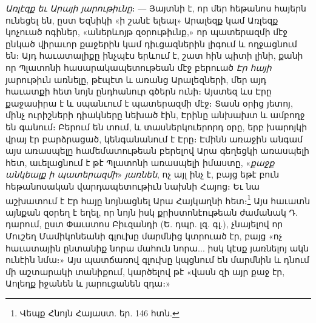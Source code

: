 \documentclass{article}
\begin{document}
{\emph{Առլէզք եւ Արայի յարութիւնը}։ — Յայտնի է, որ մեր հեթանոս հայերն ունեցել են, ըստ Եզնիկի «ի շանէ ելեալ» Արալեզք կամ Առլեզք կոչուած ոգիներ, «աներևոյթ զօրութիւնք,» որ պատերազմի մէջ ընկած վիրաւոր քաջերին կամ դիւցազներին լիգում և ողջացնում են։ Այդ հաւատալիքը ինչպէս երևում է, շատ հին պիտի լինի, քանի որ Պլատոնի հասարակապետութեան մէջ բերուած \emph{Էր հայի} յարութիւն առնելը, թէպէտ և առանց Արալեզների, մեր այդ հաւատքի հետ նոյն ընդհանուր գծերն ունի։ Այստեզ ևս Էրը քաջասիրա է և սպանւում է պատերազմի մէջ։ Տասն օրից յետոյ, մինչ ուրիշների դիակները նեխած էին, Էրինը անխախտ և ամբողջ են գանում։ Բերում են տում, և տասներկուերորդ օրը, երբ խարոյկի վրայ էր բարձրացած, կենգանանում է Էրը։ Էմինն առաջին անգամ այս առասպելը համեմատութեան բերելով Արա գեղեցկի առասպելի հետ, աւելացնում է թէ Պլատոնի առասպելի իմաստը, «\emph{քաջք անկեալք ի պատերազմի}» \emph{յառնեն}, ոչ այլ ինչ է, բայց եթէ բուն հեթանոսական վարդապետութիւն նախնի Հայոց։ Եւ նա աշխատում է Էր հայը նոյնացնել Արա Հայկաղնի հետ։\footnote{Վեպք Հնոյն Հայաստ. եր. 146 հտն.} Այս հաւատն այնքան զօրեղ է եղել, որ նոյն իսկ քրիստոնէութեան ժամանակ Դ. դարում, ըստ Փաւստոս Բիւզանդի (Ե. դպր. լզ. գլ.), չնայելով որ Մուշեղ Մամիկոնեանի գլուխը մարմնից կտրուած էր, բայց «ոչ հաւատային ընտանիք նորա մահուն նորա... իսկ կէսք յառնելոյ ակն ունէին նմա։» Այս պատճառով գլուխը կպցնում են մարմնին և դնում մի աշտարակի տանիքում, կարծելով թէ «վասն զի այր քաջ էր, Աոլեղք իջանեն և յարուցանեն զդա։»

}
\end{document}
